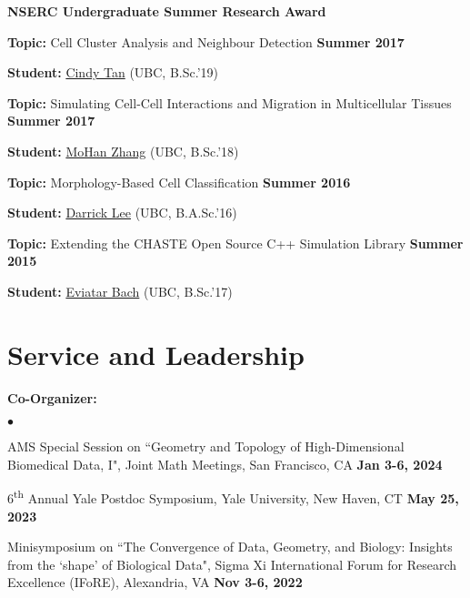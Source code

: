 \documentclass[margin,line]{res}
\newenvironment{list1}{
  \begin{list}{\ding{113}}{
      \setlength{\itemsep}{0in}
      \setlength{\parsep}{0in} \setlength{\parskip}{0in}
      \setlength{\topsep}{0in} \setlength{\partopsep}{0in}
      \setlength{\leftmargin}{0.17in}}}{\end{list}}
\newenvironment{list2}{
  \begin{list}{$\bullet$}{
      \setlength{\itemsep}{0in}
      \setlength{\parsep}{0in} \setlength{\parskip}{0in}
      \setlength{\topsep}{0in} \setlength{\partopsep}{0in}
      \setlength{\leftmargin}{0.2in}}}{\end{list}}
\begin{document}
\begin{resume}
{\bf NSERC Undergraduate Summer Research Award}
\vspace*{.2cm}
\begin{list1}
\setlength\itemsep{0.2em}
\item[] {\bf Topic:} Cell Cluster Analysis and Neighbour Detection \hfill {\bf Summer 2017}
\item[] {\bf Student:} \href{https://ca.linkedin.com/in/csxtan}{Cindy Tan} (UBC, B.Sc.'19) 
\end{list1}
\vspace*{.2cm}
\begin{list1}
\setlength\itemsep{0.2em}
\item[] {\bf Topic:} Simulating Cell-Cell Interactions and Migration in Multicellular Tissues \hfill {\bf Summer 2017}
\item[] {\bf Student:} \href{https://ca.linkedin.com/in/mohan-zhang}{MoHan Zhang} (UBC, B.Sc.'18)
\end{list1}
\vspace*{.2cm}
\begin{list1}
\setlength\itemsep{0.2em}
\item[] {\bf Topic:} Morphology-Based Cell Classification \hfill {\bf Summer 2016}
\item[] {\bf Student:} \href{https://www.math.upenn.edu/~ldarrick/}{Darrick Lee} (UBC, B.A.Sc.'16)
\end{list1}
\vspace*{.2cm}
\begin{list1}
\setlength\itemsep{0.2em}
\item[] {\bf Topic:} Extending the CHASTE Open Source C++ Simulation Library \hfill {\bf Summer 2015}
\item[] {\bf Student:} \href{http://eviatarbach.com/}{Eviatar Bach} (UBC, B.Sc.'17)
\end{list1}

\vspace*{.2cm}

\section{\sc Service and Leadership}

\begin{list1}
\setlength\itemsep{0.5em}

\item[] {\bf Co-Organizer:}
\vspace*{.2cm}
\begin{list2}
\setlength\itemsep{0.5em}
\item[] AMS Special Session on ``Geometry and Topology of High-Dimensional Biomedical Data, I", Joint Math Meetings, San Francisco, CA \hfill {\bf Jan 3-6, 2024}
\item[] 6\textsuperscript{th} Annual Yale Postdoc Symposium, Yale University, New Haven, CT \hfill {\bf May 25, 2023}
\item[] Minisymposium on ``The Convergence of Data, Geometry, and Biology: Insights from the `shape' of Biological Data", 
        Sigma Xi International Forum for Research Excellence (IFoRE), Alexandria, VA \hfill {\bf Nov 3-6, 2022}
\end{list2}


\end{list1}
\end{resume}
\end{document}
